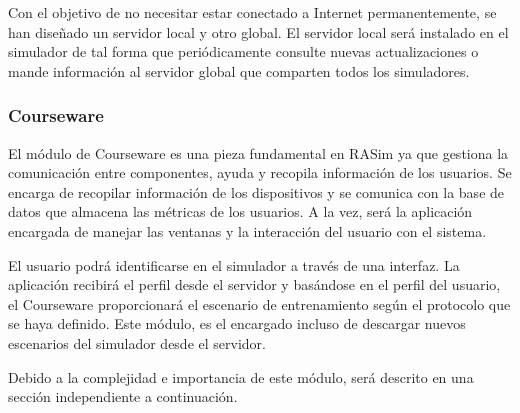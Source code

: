 Con el objetivo de no necesitar estar conectado a Internet permanentemente, se han diseñado un servidor local y otro global. El servidor local será instalado en el simulador de tal forma que periódicamente consulte nuevas actualizaciones o mande información al servidor global que comparten todos los simuladores.

\subsubsection{Courseware}


El módulo de \ac{Courseware} es una pieza fundamental en \ac{RASim} ya que gestiona la comunicación entre componentes, ayuda y recopila información de los usuarios. Se encarga de recopilar información de los dispositivos y se comunica con la base de datos que almacena las métricas de los usuarios. A la vez, será la aplicación encargada de manejar las ventanas y la interacción del usuario con el sistema. 

El usuario podrá identificarse en el simulador a través de una interfaz. La aplicación recibirá el perfil desde el servidor y basándose en el perfil del usuario, el \ac{Courseware} proporcionará el escenario de entrenamiento según el protocolo que se haya definido. Este módulo, es el encargado incluso de descargar nuevos escenarios del simulador desde el servidor. 

Debido a la complejidad e importancia de este módulo, será descrito en una sección independiente a continuación.


